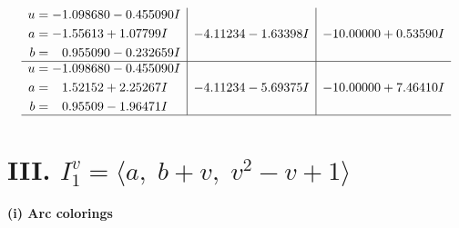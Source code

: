 \documentclass[1p]{elsarticle_modified}
\theoremstyle{definition}
\begin{document}
$$\begin{array}{c|c|c}
\begin{aligned}
u &= -1.098680 - 0.455090 I \\
a &= -1.55613 + 1.07799 I \\
b &= \phantom{-}0.955090 - 0.232659 I\end{aligned}
 & -4.11234 - 1.63398 I & -10.00000 + 0.53590 I \\ \hline\begin{aligned}
u &= -1.098680 - 0.455090 I \\
a &= \phantom{-}1.52152 + 2.25267 I \\
b &= \phantom{-}0.95509 - 1.96471 I\end{aligned}
 & -4.11234 - 5.69375 I & -10.00000 + 7.46410 I\\
 \hline 
 \end{array}$$\newpage\newpage\renewcommand{\arraystretch}{1}
\centering \section*{III. $I^v_{1}= \langle a,\;b+v,\;v^2- v+1 \rangle$}
\flushleft \textbf{(i) Arc colorings}\\
\end{document}
